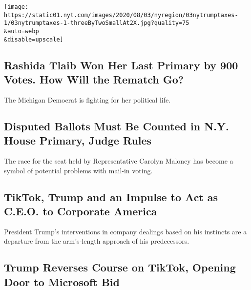 \href{/2020/08/03/nyregion/donald-trump-taxes-cyrus-vance.html}{}

\texttt{[image: https://static01.nyt.com/images/2020/08/03/nyregion/03nytrumptaxes-1/03nytrumptaxes-1-threeByTwoSmallAt2X.jpg?quality=75\\\&auto=webp\\\&disable=upscale]}

\href{/2020/08/03/us/politics/michigan-primary-rashida-tlaib-brenda-jones.html}{}

\hypertarget{rashida-tlaib-won-her-last-primary-by-900-votes-how-will-the-rematch-go}{%
\subsection{Rashida Tlaib Won Her Last Primary by 900 Votes. How Will
the Rematch
Go?}\label{rashida-tlaib-won-her-last-primary-by-900-votes-how-will-the-rematch-go}}

The Michigan Democrat is fighting for her political life.

\href{/2020/08/03/nyregion/nyc-congress-carolyn-mahoney-ballots.html}{}

\hypertarget{disputed-ballots-must-be-counted-in-ny-house-primary-judge-rules}{%
\subsection{Disputed Ballots Must Be Counted in N.Y. House Primary,
Judge
Rules}\label{disputed-ballots-must-be-counted-in-ny-house-primary-judge-rules}}

The race for the seat held by Representative Carolyn Maloney has become
a symbol of potential problems with mail-in voting.

\href{/2020/08/03/business/economy/trump-tiktok-china-business.html}{}

\hypertarget{tiktok-trump-and-an-impulse-to-act-as-ceo-to-corporate-america}{%
\subsection{TikTok, Trump and an Impulse to Act as C.E.O. to Corporate
America}\label{tiktok-trump-and-an-impulse-to-act-as-ceo-to-corporate-america}}

President Trump's interventions in company dealings based on his
instincts are a departure from the arm's-length approach of his
predecessors.

\href{/2020/08/03/technology/trump-tiktok-microsoft.html}{}

\hypertarget{trump-reverses-course-on-tiktok-opening-door-to-microsoft-bid}{%
\subsection{Trump Reverses Course on TikTok, Opening Door to Microsoft
Bid}\label{trump-reverses-course-on-tiktok-opening-door-to-microsoft-bid}}

